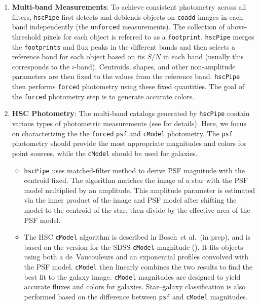 \documentclass[useamsfonts]{pasj01}
\def\etal{{\ et al.~}}
\def\hscpipe{\texttt{hscPipe}}
\def\cmodel{\texttt{cModel}}
\def\forced{\texttt{forced}}
\def\coadd{\texttt{coadd}}
\def\unforced{\texttt{unforced}}
\begin{document}
\begin{enumerate}
        \item \textbf{Multi-band Measurements}:
            To achieve consistent photometry across all filters, \hscpipe{} first
            detects and deblends objects on \coadd{} images in each band
            independently (the \unforced{} measurements).
            The collection of above-threshold pixels for each object is referred to as
            a \texttt{footprint}.
            \hscpipe{} merges the \texttt{footprints} and flux peaks in the different
            bands and then selects a reference band for each object based on its $S/N$ 
            in each band (usually this corresponds to the $i$-band).  
            Centroids, shapes, and other non-amplitude parameters are then fixed to  
            the values from the reference band. 
            \hscpipe{} then performs \forced{} photometry using these fixed quantities. 
            The goal of the  \forced{} photometry step is to generate accurate colors.
            
        \item \textbf{HSC Photometry}:
            The multi-band catalogs generated by \hscpipe{} contain various types of 
            photometric measurements (see \citealt{HSCDR1} for details). 
            Here, we focus on characterizing the the \forced{} \texttt{psf} and 
            \cmodel{} photometry. 
            The \texttt{psf} photometry should provide the most appropriate magnitudes 
            and colors for point sources, while the \cmodel{} should be used for 
            galaxies. 
            
            \begin{itemize}
            
                \item \hscpipe{} uses matched-filter method to derive PSF magnitude 
                    with the centroid fixed. 
                    The algorithm matches the image of a star with the PSF model 
                    multiplied by an amplitude. 
                    This amplitude parameter is estimated via the inner product of 
                    the image and PSF model after shifting the model to the centroid 
                    of the star, then divide by the effective area of the PSF model.
                    
                \item The HSC \cmodel{} algorithm is described in Bosch\etal (in prep), 
                    and is based on the version for the SDSS \cmodel{} magnitude 
                    (\citealt{Lupton2001, Abazajian2004}). 
                    It fits objects using both a de~Vaucouleurs and an exponential 
                    profiles convolved with the PSF model.  
                    \cmodel{} then linearly combines the two results to find the best 
                    fit to the galaxy image. 
                    \cmodel{} magnitudes are designed to yield accurate fluxes and 
                    colors for galaxies. 
                    Star--galaxy classification is also performed based on the 
                    difference between \texttt{psf} and \cmodel{}{} magnitudes.
                

\end{itemize}
\end{enumerate}
\end{document}
